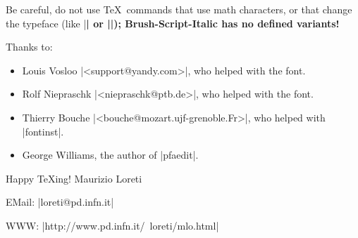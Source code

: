\documentclass[a4paper]{article}
\begin{document}
Be careful, do not use \TeX\ commands that use math
characters, or that change the typeface (like |\bfseries| or
|\sffamily|); Brush-Script-Italic has no defined variants!


\par\vspace*{1cm}\noindent Thanks to:
\begin{itemize}
\item Louis Vosloo |<support@yandy.com>|, who helped with
  the font.
\item Rolf Niepraschk |<niepraschk@ptb.de>|, who helped with
  the font.
\item Thierry Bouche |<bouche@mozart.ujf-grenoble.Fr>|, who
  helped with |fontinst|.
\item George Williams, the author of |pfaedit|.
\end{itemize}

\par\vspace*{1cm}\noindent Happy \TeX{}ing!\hfill
Maurizio Loreti\vspace*{2\baselineskip}
\par\hfill EMail: |loreti@pd.infn.it|
\par\hfill WWW: |http://www.pd.infn.it/~loreti/mlo.html|
\end{document}
